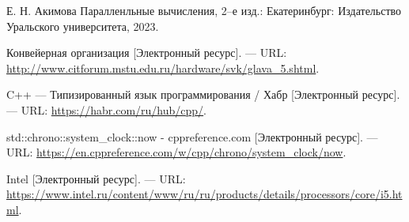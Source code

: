 
\renewcommand\bibname{Список использованных источников}
\begin{thebibliography}{}
 Е. Н. Акимова Паралленльные вычисления, 2--е изд.: Екатеринбург: Издательство Уральского университета,
2023.

 Конвейерная организация [Электронный ресурс]. --- URL: \url{http://www.citforum.mstu.edu.ru/hardware/svk/glava_5.shtml}.

C++ –– Типизированный язык программирования / Хабр [Электронный ресурс]. --- URL: \url{https://habr.com/ru/hub/cpp/}.

 std::chrono::system\_clock::now - cppreference.com [Электронный ресурс]. --- URL: \url{https://en.cppreference.com/w/cpp/chrono/system_clock/now}.

 Intel [Электронный ресурс]. --- URL: \url{https://www.intel.ru/content/www/ru/ru/products/details/processors/core/i5.html}.

\end{thebibliography}